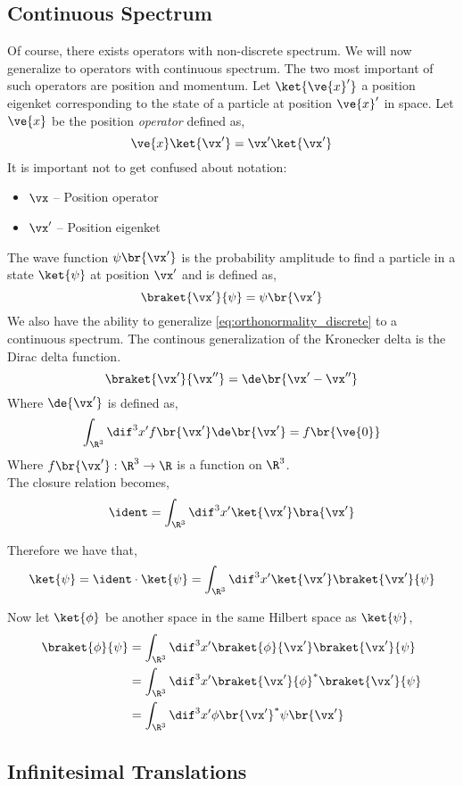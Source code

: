 \documentclass{article}
\begin{document}
\subsection{Continuous Spectrum}
Of course, there exists operators with non-discrete spectrum. We will now generalize to operators with continuous spectrum. The two most important of such operators are position and momentum. Let $\ket{\ve{x}'}$ a position eigenket corresponding to the state of a particle at position $\ve{x}'$ in space. Let $\ve{x}$ be the position \textit{operator} defined as,
\[ \ve{x} \ket{\vx'} = \vx' \ket{\vx'} \]
It is important not to get confused about notation:
\begin{itemize}
    \item $\vx$ -- Position operator
    \item $\vx'$ -- Position eigenket
\end{itemize}
The wave function $\psi\br{\vx'}$ is the probability amplitude to find a particle in a state $\ket{\psi}$ at position $\vx'$ and is defined as,
\[ \braket{\vx'}{\psi} = \psi\br{\vx'} \]
We also have the ability to generalize \cref{eq:orthonormality_discrete} to a continuous spectrum. The continous generalization of the Kronecker delta is the Dirac delta function.
\[ \braket{\vx'}{\vx''} = \de\br{\vx' - \vx''} \]
Where $\de{\vx'}$ is defined as,
\[ \int_{\R^3} \dif^3 x' f\br{\vx'} \de\br{\vx'} = f\br{\ve{0}} \]
Where $f\br{\vx'} : \R^3 \to \R$ is a function on $\R^3$. \\

The closure relation becomes,
\[ \ident = \int_{\R^3} \dif^3 x' \ket{\vx'} \bra{\vx'} \]

Therefore we have that,
\[ \ket{\psi} = \ident \cdot \ket{\psi} = \int_{\R^3} \dif^3 x' \ket{\vx'} \braket{\vx'}{\psi} \]

Now let $\ket{\phi}$ be another space in the same Hilbert space as $\ket{\psi}$,
\begin{align*}
\braket{\phi}{\psi} &= \int_{\R^3} \dif^3 x' \braket{\phi}{\vx'} \braket{\vx'}{\psi} \\
&= \int_{\R^3} \dif^3 x' \braket{\vx'}{\phi}^{*} \braket{\vx'}{\psi} \\
&= \int_{\R^3} \dif^3 x' \phi\br{\vx'}^{*} \psi\br{\vx'}
\end{align*}

\subsection{Infinitesimal Translations}
\end{document}
